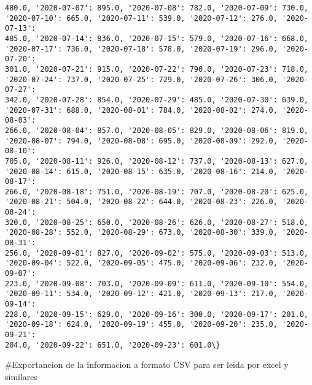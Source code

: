 \documentclass[11pt]{article}
\begin{document}
\begin{Verbatim}[commandchars=\\\{\}]
480.0, '2020-07-07': 895.0, '2020-07-08': 782.0, '2020-07-09': 730.0,
'2020-07-10': 665.0, '2020-07-11': 539.0, '2020-07-12': 276.0, '2020-07-13':
485.0, '2020-07-14': 836.0, '2020-07-15': 579.0, '2020-07-16': 668.0,
'2020-07-17': 736.0, '2020-07-18': 578.0, '2020-07-19': 296.0, '2020-07-20':
301.0, '2020-07-21': 915.0, '2020-07-22': 790.0, '2020-07-23': 718.0,
'2020-07-24': 737.0, '2020-07-25': 729.0, '2020-07-26': 306.0, '2020-07-27':
342.0, '2020-07-28': 854.0, '2020-07-29': 485.0, '2020-07-30': 639.0,
'2020-07-31': 688.0, '2020-08-01': 784.0, '2020-08-02': 274.0, '2020-08-03':
266.0, '2020-08-04': 857.0, '2020-08-05': 829.0, '2020-08-06': 819.0,
'2020-08-07': 794.0, '2020-08-08': 695.0, '2020-08-09': 292.0, '2020-08-10':
705.0, '2020-08-11': 926.0, '2020-08-12': 737.0, '2020-08-13': 627.0,
'2020-08-14': 615.0, '2020-08-15': 635.0, '2020-08-16': 214.0, '2020-08-17':
266.0, '2020-08-18': 751.0, '2020-08-19': 707.0, '2020-08-20': 625.0,
'2020-08-21': 504.0, '2020-08-22': 644.0, '2020-08-23': 226.0, '2020-08-24':
320.0, '2020-08-25': 650.0, '2020-08-26': 626.0, '2020-08-27': 518.0,
'2020-08-28': 552.0, '2020-08-29': 673.0, '2020-08-30': 339.0, '2020-08-31':
256.0, '2020-09-01': 827.0, '2020-09-02': 575.0, '2020-09-03': 513.0,
'2020-09-04': 522.0, '2020-09-05': 475.0, '2020-09-06': 232.0, '2020-09-07':
223.0, '2020-09-08': 703.0, '2020-09-09': 611.0, '2020-09-10': 554.0,
'2020-09-11': 534.0, '2020-09-12': 421.0, '2020-09-13': 217.0, '2020-09-14':
228.0, '2020-09-15': 629.0, '2020-09-16': 300.0, '2020-09-17': 201.0,
'2020-09-18': 624.0, '2020-09-19': 455.0, '2020-09-20': 235.0, '2020-09-21':
204.0, '2020-09-22': 651.0, '2020-09-23': 601.0\}
    \end{Verbatim}

    \#Exportancion de la informacion a formato CSV para ser leida por excel
y similares
\end{document}
